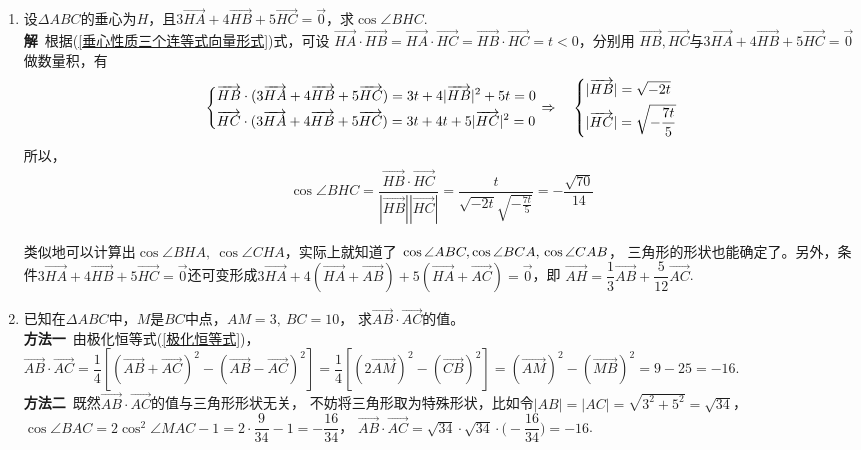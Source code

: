 \begin{enumerate}[label={【\textbf{例\thechapter.\arabic*}】},
 leftmargin=\inteval{\myenumleftmargin}pt,
 itemsep=\inteval{\myenumitempsep}pt,
 itemindent=\inteval{\myenumitemindent}pt]
\item 设$ \Delta ABC $的垂心为$ H $，且$ 3\vec{HA}+4\vec{HB}
+5\vec{HC}=\vec{0} $，求$ \cos\angle BHC $. \\
\textbf{解}\ 根据(\ref{垂心性质三个连等式向量形式})式，可设 $ \vec{HA}\cdot
\vec{HB}=\vec{HA}
\cdot\vec{HC}=\vec{HB}\cdot \vec{HC}=t<0 $，分别用
$ \vec{HB},\vec{HC} $与$ 3\vec{HA}+
4\vec{HB} +5\vec{HC}=\vec{0} $做数量积，有
\begin{gather*}
    \begin{dcases}
        \overrightarrow{HB}\cdot (3\overrightarrow{HA}+4\overrightarrow{HB} +5\overrightarrow{HC})=
        3t+4|\overrightarrow{HB}|^2+5t= 0 \\
        \overrightarrow{HC}\cdot (3\overrightarrow{HA}+4\overrightarrow{HB} +5\overrightarrow{HC})=
        3t+4t+5|\overrightarrow{HC}|^2= 0 
    \end{dcases} \Rightarrow \quad 
    \begin{dcases}
        |\overrightarrow{HB}|=\sqrt{-2t}\\
        |\overrightarrow{HC}|=\sqrt{-\dfrac{7t}{5}}
    \end{dcases}
\end{gather*}
所以，
\begin{gather*}
    \cos\angle BHC=\dfrac{\vec{HB}\cdot \vec{HC}}
    {|\vec{HB}||\vec{HC}|}=\dfrac{t}{\sqrt{-2t}\sqrt{-\frac{7t}{5}}}
    =-\dfrac{\sqrt{70}}{14} 
\end{gather*}

类似地可以计算出$ \cos\angle BHA,\ \cos\angle CHA $，实际上就知道了
$ \cos\angle ABC,\cos\angle BCA,\\ \cos\angle CAB $，
三角形的形状也能确定了。另外，条件$ 3\vec{HA}+4\vec{HB}
+5\vec{HC}=\vec{0} $还可变形成$ 3\vec{HA}+4(\vec{HA}+\vec{AB})
+5(\vec{HA}+\vec{AC})=\vec{0} $，即
$ \vec{AH}=\dfrac{1}{3}\vec{AB}+\dfrac{5}{12}\vec{AC}$.

\item 已知在$ \Delta ABC $中，$ M $是$ BC $中点，$ AM=3,\ BC=10 $，
求$ \vec{AB}\cdot \vec{AC} $的值。\\
\textbf{方法一}\ 由极化恒等式(\ref{极化恒等式})，$ \vec{AB}\cdot 
\vec{AC}=\dfrac{1}{4}[(\vec{AB}+\vec{AC})^2-
(\vec{AB}-\vec{AC})^2]=\dfrac{1}{4}[(2\vec{AM})^2-
(\vec{CB})^2]=(\vec{AM})^2-(\vec{MB})^2=9-25=-16 $. \\
\textbf{方法二}\ 既然$ \vec{AB}\cdot \vec{AC} $的值与三角形形状无关，
不妨将三角形取为特殊形状，比如令$ |AB|=|AC|=\sqrt{3^2+5^2}=\sqrt{34} $，
$ \cos\angle BAC=2\cos^2\angle MAC-1=2\cdot \dfrac{9}{34}-1=-\dfrac{16}{34} $，
$ \vec{AB}\cdot \vec{AC}=\sqrt{34}\cdot \sqrt{34}\cdot
\Big(-\dfrac{16}{34}\Big)=-16 $.


\end{enumerate}
